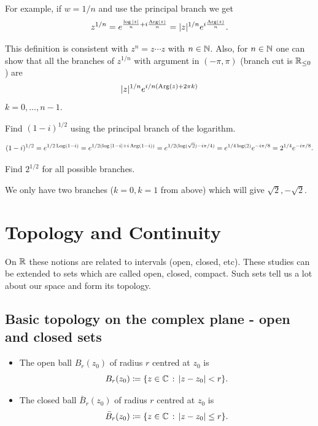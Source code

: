 \documentclass[10pt, a4paper]{article}
\begin{document}
For example,
if $w = 1 / n$ and use the principal branch we get
\[
z ^ {1 / n} = e ^ {\frac{\log|z|}{n} + i\frac{\operatorname{Arg}(z)}{n}} = |z| ^ {1 / n}e ^ {i\frac{\operatorname{Arg}(z)}{n}}.
\]

\begin{remark}
    This definition is consistent with $z ^ n = z \dotsi z$ with $n \in \mathbb{N}$.
    Also,
    for $n \in \mathbb{N}$ one can show that all the branches of $z ^ {1 / n}$ with argument in $(-\pi, \pi)$
    (branch cut is $\mathbb{R}_{\leq 0}$)
    are
    \[
    |z| ^ {1 / n}e ^ {i / n(\operatorname{Arg}(z) + 2\pi k)}
    \]
    $k = 0, \dotsc, n - 1$.
\end{remark}

\begin{example}
    Find $(1 - i) ^ {1 / 2}$ using the principal branch of the logarithm.

    \begin{solution}
        \[
        (1 - i) ^ {1 / 2} = e ^ {1 / 2\operatorname{Log}(1 - i)} = e ^ {1 / 2(\log|1 - i| + i\operatorname{Arg}(1 - i))} = e ^ {1 / 2(\log(\sqrt{2}) - i\pi / 4)} = e ^ {1 / 4\log(2)}e ^ {-i\pi / 8} = 2 ^ {1 / 4}e ^ {-i\pi / 8}.
        \]
    \end{solution}
\end{example}

\begin{example}
    Find $2 ^ {1 / 2}$ for all possible branches.

    \begin{solution}
        We only have two branches
        ($k = 0, k = 1$ from above)
        which will give $\sqrt{2}, -\sqrt{2}$.
    \end{solution}
\end{example}

\newpage

\section{Topology and Continuity}
On $\mathbb{R}$ these notions are related to intervals
(open,
closed,
etc).
These studies can be extended to sets which are called open,
closed,
compact.
Such sets tell us a lot about our space and form its topology.

\subsection{Basic topology on the complex plane -
open and closed sets}

\begin{definition}[Balls in $\C$]\phantom{}
    \begin{itemize}
        \item The open ball $B_r(z_0)$ of radius $r$ centred at $z_0$ is
        \[
        B_r(z_0) \coloneqq \{z \in \mathbb{C}\,:\,|z - z_0| < r\}.
        \]

        \item The closed ball $\bar{B}_r(z_0)$ of radius $r$ centred at $z_0$ is
        \[
        \bar{B}_r(z_0) \coloneqq \{z \in \mathbb{C}\,:\, |z - z_0| \leq r\}.
        \]
    \end{itemize}
\end{definition}
\end{document}
